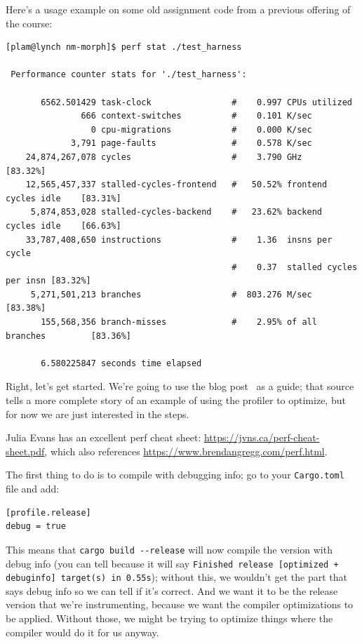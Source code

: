 \noindent
Here's a usage example on some old assignment code from a previous offering of the course:
\begin{lstlisting}[basicstyle=\ttfamily\scriptsize]
[plam@lynch nm-morph]$ perf stat ./test_harness

 Performance counter stats for './test_harness':

       6562.501429 task-clock                #    0.997 CPUs utilized          
               666 context-switches          #    0.101 K/sec                  
                 0 cpu-migrations            #    0.000 K/sec                  
             3,791 page-faults               #    0.578 K/sec                  
    24,874,267,078 cycles                    #    3.790 GHz                     [83.32%]
    12,565,457,337 stalled-cycles-frontend   #   50.52% frontend cycles idle    [83.31%]
     5,874,853,028 stalled-cycles-backend    #   23.62% backend  cycles idle    [66.63%]
    33,787,408,650 instructions              #    1.36  insns per cycle        
                                             #    0.37  stalled cycles per insn [83.32%]
     5,271,501,213 branches                  #  803.276 M/sec                   [83.38%]
       155,568,356 branch-misses             #    2.95% of all branches         [83.36%]

       6.580225847 seconds time elapsed
\end{lstlisting} %

Right, let's get started. We're going to use the blog post~\cite{rustflamegraph} as a guide; that source tells a more complete story of an example of using the profiler to optimize, but for now we are just interested in the steps.

Julia Evans has an excellent perf cheat sheet: \url{https://jvns.ca/perf-cheat-sheet.pdf}, which also references \url{https://www.brendangregg.com/perf.html}.

The first thing to do is to compile with debugging info; go to your \texttt{Cargo.toml} file and add:
\begin{verbatim}
[profile.release]
debug = true
\end{verbatim}

This means that \texttt{cargo build -{}-release} will now compile the version with debug info (you can tell because it will say \texttt{Finished release [optimized + debuginfo] target(s) in 0.55s}); without this, we wouldn't get the part that says debug info so we can tell if it's correct. And we want it to be the release version that we're instrumenting, because we want the compiler optimizations to be applied. Without those, we might be trying to optimize things where the compiler would do it for us anyway.

